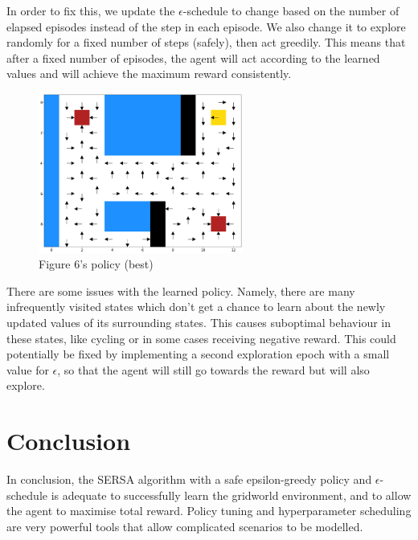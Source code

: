 \documentclass[12pt]{article}
\begin{document}
In order to fix this, we update the $\epsilon$-schedule to change based on the number of elapsed episodes instead of the step in each episode. We also change it to explore randomly for a fixed number of steps (safely), then act greedily. This means that after a fixed number of episodes, the agent will act according to the learned values and will achieve the maximum reward consistently.
\\
\begin{figure}
  \centering
  \includegraphics[width=0.6\textwidth]{10 policy.png}
  \caption{Figure 6's policy (best)}
\end{figure}

There are some issues with the learned policy. Namely, there are many infrequently visited states which don’t get a chance to learn about the newly updated values of its surrounding states. This causes suboptimal behaviour in these states, like cycling or in some cases receiving negative reward. This could potentially be fixed by implementing a second exploration epoch with a small value for $\epsilon$, so that the agent will still go towards the reward but will also explore.

\section{Conclusion}

In conclusion, the SERSA algorithm with a safe epsilon-greedy policy and $\epsilon$-schedule is adequate to successfully learn the gridworld environment, and to allow the agent to maximise total reward. Policy tuning and hyperparameter scheduling are very powerful tools that allow complicated scenarios to be modelled.
\end{document}
